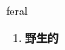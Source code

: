 
\begin{frame}
{\huge feral}
\begin{center}
\begin{enumerate}\Large
  \item \textbf{野生的}
\end{enumerate}
\end{center}
\end{frame}
